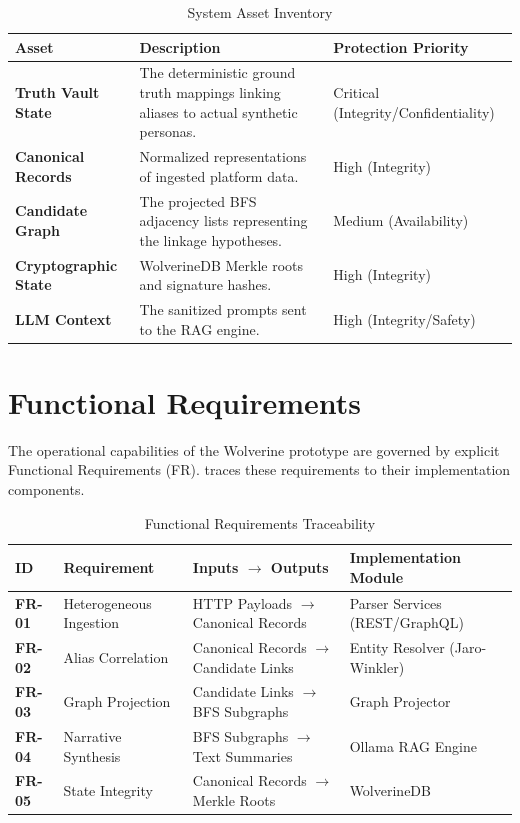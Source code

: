 \begin{table}[h]
\centering
\begin{tabular}{p{} p{} p{}}
\toprule
\textbf{Asset} & \textbf{Description} & \textbf{Protection Priority} \\
\midrule
\textbf{Truth Vault State} & The deterministic ground truth mappings linking aliases to actual synthetic personas. & Critical (Integrity/Confidentiality) \\
\addlinespace
\textbf{Canonical Records} & Normalized representations of ingested platform data. & High (Integrity) \\
\addlinespace
\textbf{Candidate Graph} & The projected BFS adjacency lists representing the linkage hypotheses. & Medium (Availability) \\
\addlinespace
\textbf{Cryptographic State} & WolverineDB Merkle roots and signature hashes. & High (Integrity) \\
\addlinespace
\textbf{LLM Context} & The sanitized prompts sent to the RAG engine. & High (Integrity/Safety) \\
\bottomrule
\end{tabular}
\caption{System Asset Inventory}
\label{tab:asset-inventory}
\end{table}

\section{Functional Requirements}
\label{sec:requirements-functional}
The operational capabilities of the Wolverine prototype are governed by explicit Functional Requirements (FR).  traces these requirements to their implementation components.

\begin{table}[h]
\centering
\begin{tabular}{p{} p{} p{} p{}}
\toprule
\textbf{ID} & \textbf{Requirement} & \textbf{Inputs $\rightarrow$ Outputs} & \textbf{Implementation Module} \\
\midrule
\textbf{FR-01} & Heterogeneous Ingestion & HTTP Payloads $\rightarrow$ Canonical Records & Parser Services (REST/GraphQL) \\
\addlinespace
\textbf{FR-02} & Alias Correlation & Canonical Records $\rightarrow$ Candidate Links & Entity Resolver (Jaro-Winkler) \\
\addlinespace
\textbf{FR-03} & Graph Projection & Candidate Links $\rightarrow$ BFS Subgraphs & Graph Projector \\
\addlinespace
\textbf{FR-04} & Narrative Synthesis & BFS Subgraphs $\rightarrow$ Text Summaries & Ollama RAG Engine \\
\addlinespace
\textbf{FR-05} & State Integrity & Canonical Records $\rightarrow$ Merkle Roots & WolverineDB \\
\bottomrule
\end{tabular}
\caption{Functional Requirements Traceability}
\label{tab:functional-requirements}
\end{table}

